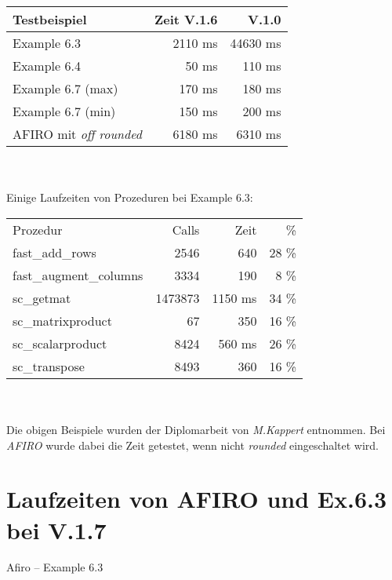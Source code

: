 \documentclass[a4paper]{article}
\begin{document}
\begin{tabular}{lrr}
Testbeispiel & Zeit V.1.6 & V.1.0\\
\hline
Example 6.3 & 2110 ms & 44630 ms \\
Example 6.4 & 50 ms & 110 ms \\
Example 6.7 (max) & 170 ms & 180 ms \\
Example 6.7 (min) & 150 ms & 200 ms \\
\hline
AFIRO mit \textit{off rounded} & 6180 ms & 6310 ms \\
\end{tabular}\\
\\
Einige Laufzeiten von Prozeduren bei Example 6.3: 
\\
\begin{tabular}{lrrr}
Prozedur & Calls & Zeit & \% \\
fast\_add\_rows & 2546 & 640 & 28 \% \\
fast\_augment\_columns & 3334 & 190 & 8 \% \\
sc\_getmat & 1473873 & 1150 ms & 34 \% \\
sc\_matrixproduct & 67 & 350 & 16 \% \\
sc\_scalarproduct & 8424 & 560 ms & 26 \% \\
sc\_transpose & 8493 & 360 & 16 \% \\
\end{tabular}
\\
\\
Die obigen Beispiele wurden der Diplomarbeit von \textit{M.Kappert} entnommen. Bei \textit{AFIRO} wurde dabei die Zeit getestet, wenn nicht \textit{rounded} eingeschaltet wird.

\section{Laufzeiten von AFIRO und Ex.6.3 bei V.1.7}

Afiro -- Example 6.3 \\
\end{document}
